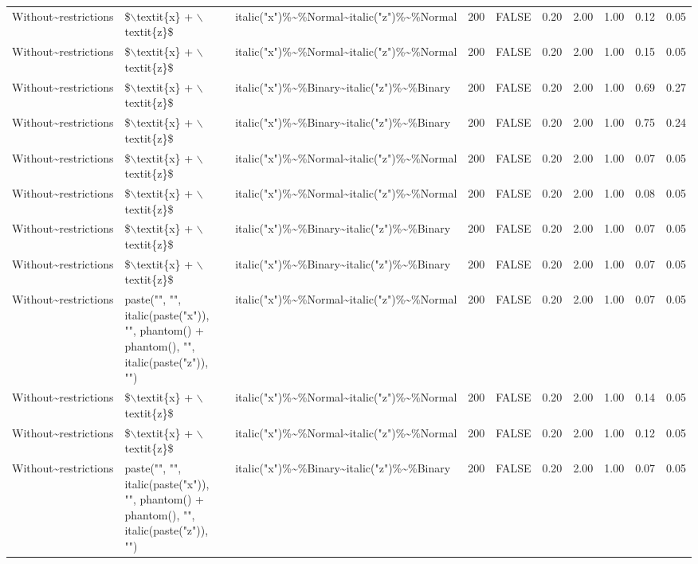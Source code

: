 \begin{longtable}{lllrlrrrrr}
  Without\~{}restrictions & \$$\backslash$textit\{x\} + $\backslash$textit\{z\}\$ & italic("x")\%\~{}\%Normal\~{}italic("z")\%\~{}\%Normal & 200 & FALSE & 0.20 & 2.00 & 1.00 & 0.12 & 0.05 \\ 
  Without\~{}restrictions & \$$\backslash$textit\{x\} + $\backslash$textit\{z\}\$ & italic("x")\%\~{}\%Normal\~{}italic("z")\%\~{}\%Normal & 200 & FALSE & 0.20 & 2.00 & 1.00 & 0.15 & 0.05 \\ 
  Without\~{}restrictions & \$$\backslash$textit\{x\} + $\backslash$textit\{z\}\$ & italic("x")\%\~{}\%Binary\~{}italic("z")\%\~{}\%Binary & 200 & FALSE & 0.20 & 2.00 & 1.00 & 0.69 & 0.27 \\ 
  Without\~{}restrictions & \$$\backslash$textit\{x\} + $\backslash$textit\{z\}\$ & italic("x")\%\~{}\%Binary\~{}italic("z")\%\~{}\%Binary & 200 & FALSE & 0.20 & 2.00 & 1.00 & 0.75 & 0.24 \\ 
  Without\~{}restrictions & \$$\backslash$textit\{x\} + $\backslash$textit\{z\}\$ & italic("x")\%\~{}\%Normal\~{}italic("z")\%\~{}\%Normal & 200 & FALSE & 0.20 & 2.00 & 1.00 & 0.07 & 0.05 \\ 
  Without\~{}restrictions & \$$\backslash$textit\{x\} + $\backslash$textit\{z\}\$ & italic("x")\%\~{}\%Normal\~{}italic("z")\%\~{}\%Normal & 200 & FALSE & 0.20 & 2.00 & 1.00 & 0.08 & 0.05 \\ 
  Without\~{}restrictions & \$$\backslash$textit\{x\} + $\backslash$textit\{z\}\$ & italic("x")\%\~{}\%Binary\~{}italic("z")\%\~{}\%Binary & 200 & FALSE & 0.20 & 2.00 & 1.00 & 0.07 & 0.05 \\ 
  Without\~{}restrictions & \$$\backslash$textit\{x\} + $\backslash$textit\{z\}\$ & italic("x")\%\~{}\%Binary\~{}italic("z")\%\~{}\%Binary & 200 & FALSE & 0.20 & 2.00 & 1.00 & 0.07 & 0.05 \\ 
  Without\~{}restrictions & paste("", "", italic(paste("x")), "", phantom() + phantom(), "", italic(paste("z")), "") & italic("x")\%\~{}\%Normal\~{}italic("z")\%\~{}\%Normal & 200 & FALSE & 0.20 & 2.00 & 1.00 & 0.07 & 0.05 \\ 
  Without\~{}restrictions & \$$\backslash$textit\{x\} + $\backslash$textit\{z\}\$ & italic("x")\%\~{}\%Normal\~{}italic("z")\%\~{}\%Normal & 200 & FALSE & 0.20 & 2.00 & 1.00 & 0.14 & 0.05 \\ 
  Without\~{}restrictions & \$$\backslash$textit\{x\} + $\backslash$textit\{z\}\$ & italic("x")\%\~{}\%Normal\~{}italic("z")\%\~{}\%Normal & 200 & FALSE & 0.20 & 2.00 & 1.00 & 0.12 & 0.05 \\ 
  Without\~{}restrictions & paste("", "", italic(paste("x")), "", phantom() + phantom(), "", italic(paste("z")), "") & italic("x")\%\~{}\%Binary\~{}italic("z")\%\~{}\%Binary & 200 & FALSE & 0.20 & 2.00 & 1.00 & 0.07 & 0.05 \\ 

\end{longtable}
